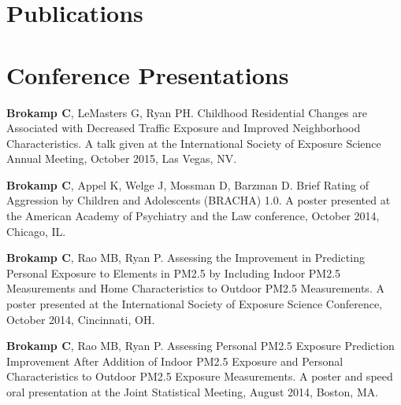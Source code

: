 \documentclass[margin,line]{res}
\newenvironment{list3}{
  \begin{list}{}{%
      \setlength{\itemsep}{0in}
      \setlength{\parsep}{0in} \setlength{\parskip}{0in}
      \setlength{\topsep}{0in} \setlength{\partopsep}{0in} 
      \setlength{\leftmargin}{0in}}}{\end{list}}
\begin{document}
\begin{resume}
\section{\sc Publications}



\section{\sc Conference Presentations}
\begin{list3} \itemsep 4pt
\item[] \textbf{Brokamp C}, LeMasters G, Ryan PH. Childhood Residential Changes are Associated with Decreased Traffic Exposure and Improved Neighborhood Characteristics. A talk given at the International Society of Exposure Science Annual Meeting, October 2015, Las Vegas, NV.
\item[] \textbf{Brokamp C}, Appel K, Welge J, Mossman D, Barzman D. Brief Rating of Aggression by Children and Adolescents (BRACHA) 1.0.  A poster presented at the American Academy of Psychiatry and the Law conference, October 2014, Chicago, IL. 
\item[] \textbf{Brokamp C}, Rao MB, Ryan P. Assessing the Improvement in Predicting Personal Exposure to Elements in PM2.5 by Including Indoor PM2.5 Measurements and Home Characteristics to Outdoor PM2.5 Measurements.  A poster presented at the International Society of Exposure Science Conference, October 2014, Cincinnati, OH.
\item[] \textbf{Brokamp C}, Rao MB, Ryan P. Assessing Personal PM2.5 Exposure Prediction Improvement After Addition of Indoor PM2.5 Exposure and Personal Characteristics to Outdoor PM2.5 Exposure Measurements. A poster and speed oral presentation at the Joint Statistical Meeting, August 2014, Boston, MA.

\end{list3}
\end{resume}
\end{document}

